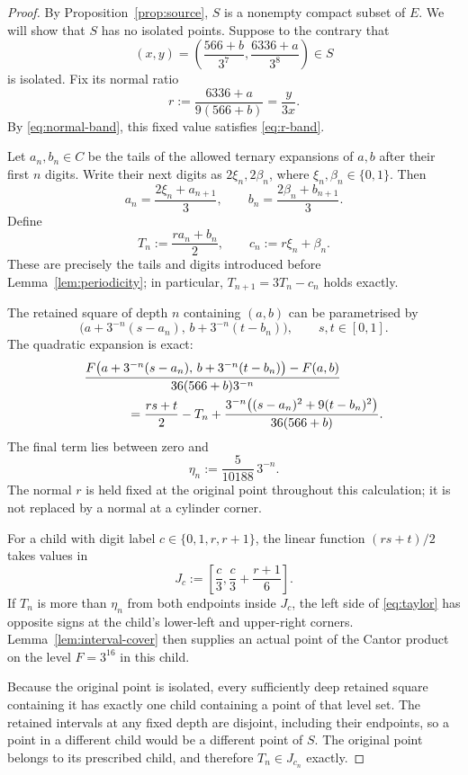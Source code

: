 \documentclass[11pt,a4paper]{amsart}
\numberwithin{equation}{section}
\theoremstyle{definition}
\begin{document}
\begin{proof}
By Proposition~\ref{prop:source}, \(S\) is a nonempty compact subset
of \(E\). We will show that \(S\) has no isolated points.
Suppose to the contrary that
\[
(x,y)=\left(\frac{566+b}{3^7},\frac{6336+a}{3^8}\right)\in S
\]
is isolated. Fix its normal ratio
\[
r:=\frac{6336+a}{9(566+b)}=\frac{y}{3x}.
\]
By \eqref{eq:normal-band}, this fixed value satisfies
\eqref{eq:r-band}.

Let \(a_n,b_n\in C\) be the tails of the allowed ternary expansions
of \(a,b\) after their first \(n\) digits. Write their next digits as
\(2\xi_n,2\beta_n\), where \(\xi_n,\beta_n\in\{0,1\}\).
Then
\[
a_n=\frac{2\xi_n+a_{n+1}}3,\qquad
b_n=\frac{2\beta_n+b_{n+1}}3.
\]
Define
\[
T_n:=\frac{ra_n+b_n}{2},\qquad c_n:=r\xi_n+\beta_n.
\]
These are precisely the tails and digits introduced before Lemma~\ref{lem:periodicity};
in particular, \(T_{n+1}=3T_n-c_n\) holds exactly.

The retained square of depth \(n\) containing \((a,b)\) can be
parametrised by
\[
\bigl(a+3^{-n}(s-a_n),\,b+3^{-n}(t-b_n)\bigr),
\qquad s,t\in[0,1].
\]
The quadratic expansion is exact:
\begin{align}
&\frac{F\bigl(a+3^{-n}(s-a_n),\,b+3^{-n}(t-b_n)\bigr)-F(a,b)}
       {36(566+b)3^{-n}}\notag\\
&\hspace{12mm}=\frac{rs+t}{2}-T_n
 +\frac{3^{-n}\bigl((s-a_n)^2+9(t-b_n)^2\bigr)}{36(566+b)}.
\label{eq:taylor}
\end{align}
The final term lies between zero and
\[
\eta_n:=\frac{5}{10188}\,3^{-n}.
\]
The normal \(r\) is held fixed at the original point throughout this
calculation; it is not replaced by a normal at a cylinder corner.

For a child with digit label \(c\in\{0,1,r,r+1\}\), the linear function
\((rs+t)/2\) takes values in
\[
J_c:=\left[\frac c3,\frac c3+\frac{r+1}{6}\right].
\]
If \(T_n\) is more than \(\eta_n\) from both endpoints inside \(J_c\),
the left side of \eqref{eq:taylor} has opposite signs at the child's
lower-left and upper-right corners. Lemma~\ref{lem:interval-cover}
then supplies an actual point of the Cantor product on the level
\(F=3^{16}\) in this child.

Because the original point is isolated, every sufficiently deep
retained square containing it has exactly one child containing a
point of that level set. The retained intervals at any fixed depth
are disjoint, including their endpoints, so a point in a different
child would be a different point of \(S\).
The original point belongs to its prescribed child, and therefore
\(T_n\in J_{c_n}\) exactly.


\end{proof}
\end{document}
